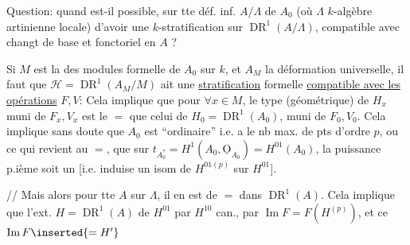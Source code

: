 Question: quand est-il possible, sur tte déf. inf. $A/\Lambda$ de $A_0$ (où $\Lambda$ $k$-algèbre artinienne locale) d'avoir une $k$-stratification sur $\operatorname{DR}^1(A/\Lambda)$, compatible avec changt de base et fonctoriel en $A$ ?

Si $M$ est la  des modules formelle de $A_0$ sur $k$,  et $A_M$ la déformation universelle, il faut que $\mathcal H=\operatorname{DR}^1(A_M/M)$ ait une \uline{stratification} formelle \uline{compatible avec les opérations} $F,V$:
Cela implique que pour $\forall x\in M$, le type (géométrique) de $H_x$ muni de $F_x,V_x$ est le $=$ que celui de $H_0=\operatorname{DR}^1(A_0)$, muni de $F_0,V_0$. Cela implique sans doute que $A_0$ est ``ordinaire'' i.e. a le nb max. de pts d'ordre $p$, ou ce qui revient au $=$, que sur $t_{A_0^*}=H^1(A_0,\underline{\mathrm O}_{A_0})=H^{01}(A_0)$, la puissance p.ième soit un  [i.e. induise un isom de $H^{01(p)}$ sur $H^{01}$].


// Mais alors  pour tte $A$ sur $\Lambda$, il en est de $=$ dans $\operatorname{DR}^1(A)$. Cela implique que l'ext. $H=\operatorname{DR}^1(A)$ de $H^{01}$ par $H^{10}$  can., par $\operatorname{Im}F=F(H^{(p)})$, et ce $\operatorname{Im}F\inserted{=H'}$ 

